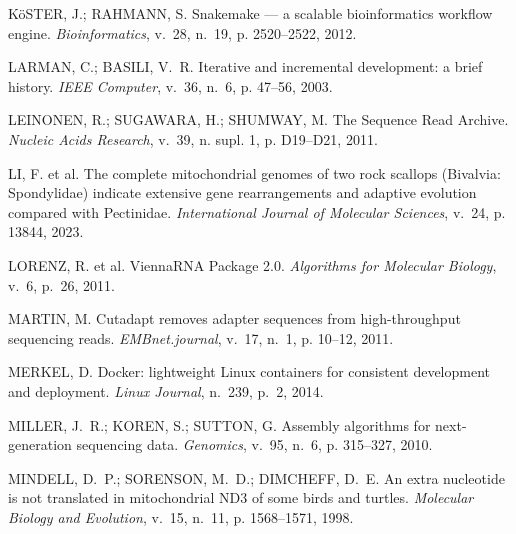 \begin{thebibliography}{}
{KöSTER, J.; RAHMANN, S. Snakemake --- a scalable bioinformatics workflow
  engine.
\emph{Bioinformatics}, v.~28, n.~19, p. 2520--2522, 2012.}

{LARMAN, C.; BASILI, V.~R. Iterative and incremental development: a brief
  history.
\emph{IEEE Computer}, v.~36, n.~6, p. 47--56, 2003.}

{LEINONEN, R.; SUGAWARA, H.; SHUMWAY, M. The {S}equence {R}ead {A}rchive.
\emph{Nucleic Acids Research}, v.~39, n. supl. 1, p. D19--D21, 2011.}

{LI, F. et al. The complete mitochondrial genomes of two rock scallops
  ({B}ivalvia: {S}pondylidae) indicate extensive gene rearrangements and
  adaptive evolution compared with {P}ectinidae.
\emph{International Journal of Molecular Sciences}, v.~24, p. 13844, 2023.}

{LORENZ, R. et al. {ViennaRNA Package 2.0}.
\emph{Algorithms for Molecular Biology}, v.~6, p.~26, 2011.}

{MARTIN, M. Cutadapt removes adapter sequences from high-throughput sequencing
  reads.
\emph{EMBnet.journal}, v.~17, n.~1, p. 10--12, 2011.}

{MERKEL, D. Docker: lightweight {L}inux containers for consistent development
  and deployment.
\emph{Linux Journal}, n.~239, p.~2, 2014.}

{MILLER, J.~R.; KOREN, S.; SUTTON, G. Assembly algorithms for next-generation
  sequencing data.
\emph{Genomics}, v.~95, n.~6, p. 315--327, 2010.}

{MINDELL, D.~P.; SORENSON, M.~D.; DIMCHEFF, D.~E. An extra nucleotide is not
  translated in mitochondrial {ND3} of some birds and turtles.
\emph{Molecular Biology and Evolution}, v.~15, n.~11, p. 1568--1571, 1998.}


\end{thebibliography}
